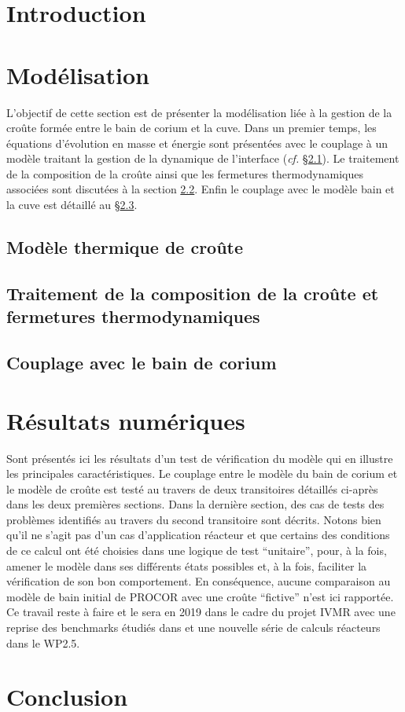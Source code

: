 \documentclass[12pt,a4paper]{article}
\begin{document}
\section{Introduction} \label{sect:introduction}

\section{Modélisation} \label{sect:modelisation}
L'objectif de cette section est de présenter la modélisation liée à la gestion de la croûte formée entre le bain de corium et la cuve. Dans un premier temps, les équations d'évolution en masse et énergie sont présentées avec le couplage à un modèle traitant la gestion de la dynamique de l'interface (\textit{cf.} \S \ref{sect:thermique}). Le traitement de la composition de la croûte ainsi que les fermetures thermodynamiques associées sont discutées à la section \ref{sect:thermochimie}. Enfin le couplage avec le modèle bain et la cuve est détaillé au \S \ref{sect:couplage}.
\subsection{Modèle thermique de croûte} \label{sect:thermique}

\subsection{Traitement de la composition de la croûte et fermetures thermodynamiques} \label{sect:thermochimie}

\subsection{Couplage avec le bain de corium}\label{sect:couplage}

\section{Résultats numériques} \label{sect:num}
Sont présentés ici les résultats d'un test de vérification du modèle qui en illustre les principales caractéristiques. Le couplage entre le modèle du bain de corium et le modèle de croûte est testé au travers de deux transitoires détaillés ci-après dans les deux premières sections. Dans la dernière section, des cas de tests des problèmes identifiés au travers du second transitoire sont décrits. Notons bien qu'il ne s'agit pas d'un cas d'application réacteur et que certains des conditions de ce calcul ont été choisies dans une logique de test ``unitaire'', pour, à la fois, amener le modèle dans ses différents états possibles et, à la fois, faciliter la vérification de son bon comportement. En conséquence, aucune comparaison au modèle de bain initial de PROCOR avec une croûte ``fictive'' n'est ici rapportée. Ce travail reste à faire et le sera en 2019 dans le cadre du projet IVMR avec une reprise des benchmarks étudiés dans \cite{Carenini2019} et une nouvelle série de calculs réacteurs dans le WP2.5.

\section{Conclusion} \label{sect:conclusion}




\end{document}
